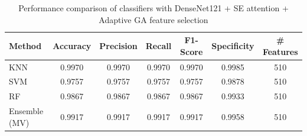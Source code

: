 \begin{table}[htbp]
\centering
\caption{Performance comparison of classifiers with DenseNet121 + SE attention + Adaptive GA feature selection}
\label{tab:table2}
\begin{tabular}{lcccccc}
\toprule
Method & Accuracy & Precision & Recall & F1-Score & Specificity & \# Features \\
\midrule
KNN & 0.9970 & 0.9970 & 0.9970 & 0.9970 & 0.9985 & 510 \\
SVM & 0.9757 & 0.9757 & 0.9757 & 0.9757 & 0.9878 & 510 \\
RF & 0.9867 & 0.9867 & 0.9867 & 0.9867 & 0.9933 & 510 \\
Ensemble (MV) & 0.9917 & 0.9917 & 0.9917 & 0.9917 & 0.9958 & 510 \\
\bottomrule
\end{tabular}
\end{table}
